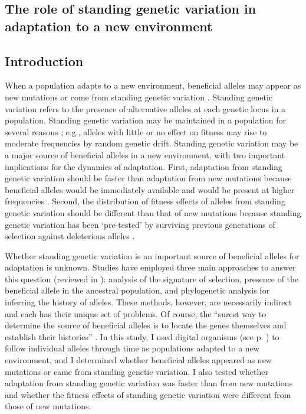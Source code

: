 \begin{doublespace}

\chapter{The role of standing genetic variation
  in adaptation to a new environment}
\label{chap:sgv}



\section{Introduction}



When a population adapts to a new environment,
beneficial alleles may appear as new mutations
or come from standing genetic variation \citep{bar08}.
%
Standing genetic variation refers to the presence
of alternative alleles at each genetic locus in a population.
%
Standing genetic variation may be maintained
in a population for several reasons \citep{har97};
e.g., alleles with little or no effect on fitness
may rise to moderate frequencies by random genetic drift.
%
Standing genetic variation may be a major source
of beneficial alleles in a new environment,
with two important implications for the dynamics of adaptation.
%
First, adaptation from standing genetic variation
should be faster than adaptation from new mutations
because beneficial alleles would be immediately available
and would be present at higher frequencies \citep{bar08}.
%
Second, the distribution of fitness effects of alleles
from standing genetic variation should be different
than that of new mutations because standing genetic variation
has been `pre-tested' by surviving previous generations
of selection against deleterious alleles \citep{bar08}.



Whether standing genetic variation is an important source
of beneficial alleles for adaptation is unknown.
%
Studies have employed three main approaches
to answer this question (reviewed in \citet{bar08}):
analysis of the signature of selection,
presence of the beneficial allele in the ancestral population,
and phylogenetic analysis for inferring the history of alleles.
%
These methods, however, are necessarily indirect
and each has their unique set of problems.
%
Of course, the ``surest way to determine
the source of beneficial alleles is to locate
the genes themselves and establish their histories'' \citep{bar08}.
%
In this study, I used digital organisms (see p. \pageref{sec:avida})
to follow individual alleles through time
as populations adapted to a new environment,
and I determined whether beneficial alleles
appeared as new mutations or came from standing genetic variation.
%
I also tested whether adaptation from standing genetic variation
was faster than from new mutations
and whether the fitness effects of standing genetic variation
were different from those of new mutations.




\end{doublespace}
